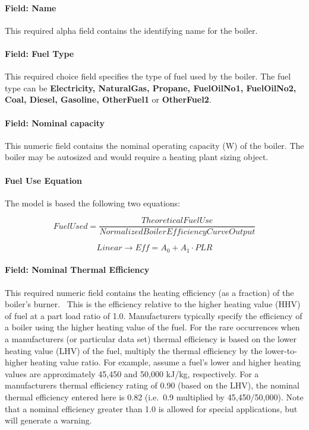 \paragraph{Field: Name}\label{field-name-9-012}

This required alpha field contains the identifying name for the boiler.

\paragraph{Field: Fuel Type}\label{field-fuel-type-3-000}

This required choice field specifies the type of fuel used by the boiler. The fuel type can be \textbf{Electricity, NaturalGas, Propane, FuelOilNo1, FuelOilNo2, Coal, Diesel, Gasoline, OtherFuel1} or \textbf{OtherFuel2}.

\paragraph{Field: Nominal capacity}\label{field-nominal-capacity-6}

This numeric field contains the nominal operating capacity (W) of the boiler. The boiler may be autosized and would require a heating plant sizing object.

\paragraph{Fuel Use Equation}\label{fuel-use-equation}

The model is based the following two equations:

\begin{equation}
    FuelUsed = \frac{{TheoreticalFuelUse}}{{NormalizedBoilerEfficiencyCurveOutput}}
\end{equation}

\begin{equation}
    Linear \to Eff = {A_0} + {A_1}\cdot PLR
\end{equation}

\paragraph{Field: Nominal Thermal Efficiency}\label{field-nominal-thermal-efficiency}

This required numeric field contains the heating efficiency (as a fraction) of the boiler's burner.~ This is the efficiency relative to the higher heating value (HHV) of fuel at a part load ratio of 1.0. Manufacturers typically specify the efficiency of a boiler using the higher heating value of the fuel. For the rare occurrences when a manufacturers (or particular data set) thermal efficiency is based on the lower heating value (LHV) of the fuel, multiply the thermal efficiency by the lower-to-higher heating value ratio. For example, assume a fuel's lower and higher heating values are approximately 45,450 and 50,000 kJ/kg, respectively. For a manufacturers thermal efficiency rating of 0.90 (based on the LHV), the nominal thermal efficiency entered here is 0.82 (i.e.~0.9 multiplied by 45,450/50,000). Note that a nominal efficiency greater than 1.0 is allowed for special applications, but will generate a warning.

